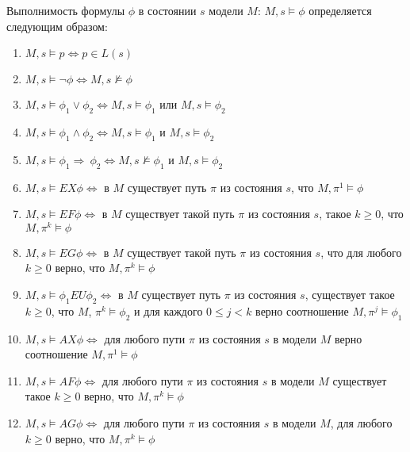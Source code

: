 \documentclass[12pt]{article}
\begin{document}
Выполнимость формулы $\phi$ в состоянии $s$ модели $M$: $M, s \vDash \phi$ определяется следующим образом:
\begin{enumerate}

    \item $M, s \vDash p \Leftrightarrow p \in L(s) $
    \item $M, s \vDash \neg \phi \Leftrightarrow M, s \nvDash \phi$
    \item $M, s \vDash \phi_1 \vee \phi_2  \Leftrightarrow M, s \vDash \phi_1$ или $M, s \vDash \phi_2 $
    \item $M, s \vDash \phi_1 \wedge \phi_2 \Leftrightarrow M, s \vDash \phi_1$ и $M, s \vDash \phi_2 $
    \item $M, s \vDash \phi_1 \Rightarrow\ \phi_2 \Leftrightarrow M, s \nvDash \phi_1$ и $M, s \vDash \phi_2 $
    
    \item $M, s \vDash EX\phi \Leftrightarrow$ в $M$ существует путь $\pi$ из состояния $s$, что  $M, \pi^{1} \vDash \phi$
    
    \item $M, s \vDash EF\phi \Leftrightarrow$ в $M$ существует такой путь $\pi$ из состояния $s$, такое $k \geq 0$, что $M, \pi^{k} \vDash \phi$ 
    
    \item $M, s \vDash EG\phi \Leftrightarrow$ в $M$ существует такой путь $\pi$ из состояния $s$, что для любого $k \geq 0$ верно, что $M, \pi^{k} \vDash \phi$ 
    
    \item $M, s \vDash \phi_1 EU \phi_2 \Leftrightarrow$ в $M$ существует путь $\pi$ из состояния $s$, существует такое $k \geq 0$, что $M$, $\pi^{k} \vDash \phi_2$ и для каждого $0 \leq j < k$ верно соотношение $M, \pi^{j} \vDash \phi_1$
    
    \item $M, s \vDash AX\phi \Leftrightarrow$ для любого пути $\pi$ из состояния $s$ в модели $M$ верно соотношение $M, \pi^{1} \vDash \phi$ 
    
    \item $M, s \vDash AF\phi \Leftrightarrow$ для любого пути $\pi$ из состояния $s$ в модели $M$ существует такое $k \geq 0$ верно, что $M, \pi^{k} \vDash \phi$ 
    
    \item $M, s \vDash AG\phi \Leftrightarrow$ для любого пути $\pi$ из состояния $s$ в модели $M$, для любого $k \geq 0$ верно, что $M, \pi^{k} \vDash \phi$ 
    

\end{enumerate}
\end{document}
